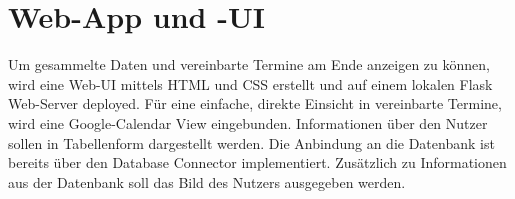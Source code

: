     
    \section{Web-App und -UI} \label{Realisierung: web gui}
        Um gesammelte Daten und vereinbarte Termine am Ende anzeigen zu können, wird eine Web-UI mittels HTML und CSS erstellt und auf einem lokalen Flask Web-Server deployed. Für eine einfache, direkte Einsicht in vereinbarte Termine, wird eine Google-Calendar View eingebunden. Informationen über den Nutzer sollen in Tabellenform dargestellt werden. Die Anbindung an die Datenbank ist bereits über den Database Connector implementiert. Zusätzlich zu Informationen aus der Datenbank soll das Bild des Nutzers ausgegeben werden. 